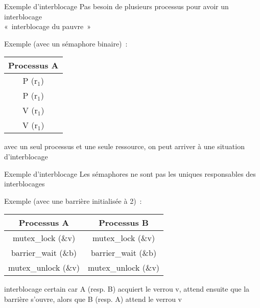 \begin {frame} {Exemple d'interblocage}
    Pas besoin de plusieurs processus pour avoir un interblocage
    \\
    \implique «~interblocage du pauvre~»

    \vspace* {3mm}

    Exemple (avec un sémaphore binaire)~:

    \begin {center}
	\footnotesize
	\begin {tabular} {c}
	    Processus A \\
	    \hline
	    P (r$_1$) \\
	    P (r$_1$) \\
	    V (r$_1$) \\
	    V (r$_1$) \\
	\end {tabular}
    \end {center}

    \implique avec un seul processus et une seule ressource, on peut
    arriver à une situation d'interblocage

\end {frame}

\begin {frame} {Exemple d'interblocage}
    Les sémaphores ne sont pas les uniques responsables des interblocages

    \vspace* {3mm}

    Exemple (avec une barrière initialisée à 2)~:

    \begin {center}
	\footnotesize
	\begin {tabular} {c|c}
	    Processus A & Processus B \\
	    \hline
	    mutex\_lock (\&v) & mutex\_lock (\&v) \\
	    barrier\_wait (\&b) & barrier\_wait (\&b) \\
	    mutex\_unlock (\&v) & mutex\_unlock (\&v) \\
	\end {tabular}
    \end {center}

    \implique interblocage certain car A (resp. B) acquiert le verrou
    v, attend ensuite que la barrière s'ouvre, alors que B (resp. A)
    attend le verrou v


\end {frame}

